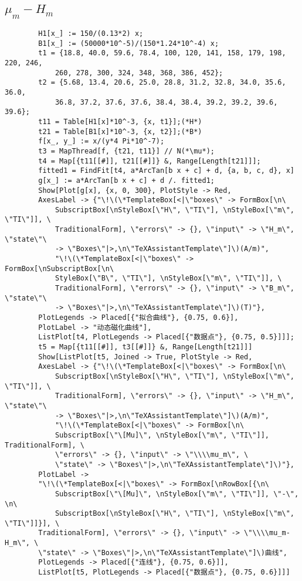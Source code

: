 \documentclass[11pt]{article}
\begin{document}
	\subsection{$\mu_m-H_m$}
	\begin{lstlisting}
		H1[x_] := 150/(0.13*2) x;
		B1[x_] := (50000*10^-5)/(150*1.24*10^-4) x;
		t1 = {18.8, 40.0, 59.6, 78.4, 100, 120, 141, 158, 179, 198, 220, 246, 
			260, 278, 300, 324, 348, 368, 386, 452};
		t2 = {5.68, 13.4, 20.6, 25.0, 28.8, 31.2, 32.8, 34.0, 35.6, 36.0, 
			36.8, 37.2, 37.6, 37.6, 38.4, 38.4, 39.2, 39.2, 39.6, 39.6};
		t11 = Table[H1[x]*10^-3, {x, t1}];(*H*)
		t21 = Table[B1[x]*10^-3, {x, t2}];(*B*)
		f[x_, y_] := x/(y*4 Pi*10^-7);
		t3 = MapThread[f, {t21, t11}] // N(*\mu*);
		t4 = Map[{t11[[#]], t21[[#]]} &, Range[Length[t21]]];
		fitted1 = FindFit[t4, a*ArcTan[b x + c] + d, {a, b, c, d}, x]
		g[x_] := a*ArcTan[b x + c] + d /. fitted1;
		Show[Plot[g[x], {x, 0, 300}, PlotStyle -> Red, 
		AxesLabel -> {"\!\(\*TemplateBox[<|\"boxes\" -> FormBox[\n\
			SubscriptBox[\nStyleBox[\"H\", \"TI\"], \nStyleBox[\"m\", \"TI\"]], \
			TraditionalForm], \"errors\" -> {}, \"input\" -> \"H_m\", \"state\"\
			-> \"Boxes\"|>,\n\"TeXAssistantTemplate\"]\)(A/m)", 
			"\!\(\*TemplateBox[<|\"boxes\" -> FormBox[\nSubscriptBox[\n\
			StyleBox[\"B\", \"TI\"], \nStyleBox[\"m\", \"TI\"]], \
			TraditionalForm], \"errors\" -> {}, \"input\" -> \"B_m\", \"state\"\
			-> \"Boxes\"|>,\n\"TeXAssistantTemplate\"]\)(T)"}, 
		PlotLegends -> Placed[{"拟合曲线"}, {0.75, 0.6}], 
		PlotLabel -> "动态磁化曲线"], 
		ListPlot[t4, PlotLegends -> Placed[{"数据点"}, {0.75, 0.5}]]];
		t5 = Map[{t11[[#]], t3[[#]]} &, Range[Length[t21]]]
		Show[ListPlot[t5, Joined -> True, PlotStyle -> Red, 
		AxesLabel -> {"\!\(\*TemplateBox[<|\"boxes\" -> FormBox[\n\
			SubscriptBox[\nStyleBox[\"H\", \"TI\"], \nStyleBox[\"m\", \"TI\"]], \
			TraditionalForm], \"errors\" -> {}, \"input\" -> \"H_m\", \"state\"\
			-> \"Boxes\"|>,\n\"TeXAssistantTemplate\"]\)(A/m)", 
			"\!\(\*TemplateBox[<|\"boxes\" -> FormBox[\n\
			SubscriptBox[\"\[Mu]\", \nStyleBox[\"m\", \"TI\"]], TraditionalForm], \
			\"errors\" -> {}, \"input\" -> \"\\\\mu_m\", \
			\"state\" -> \"Boxes\"|>,\n\"TeXAssistantTemplate\"]\)"}, 
		PlotLabel -> 
		"\!\(\*TemplateBox[<|\"boxes\" -> FormBox[\nRowBox[{\n\
			SubscriptBox[\"\[Mu]\", \nStyleBox[\"m\", \"TI\"]], \"-\", \n\
			SubscriptBox[\nStyleBox[\"H\", \"TI\"], \nStyleBox[\"m\", \"TI\"]]}], \
		TraditionalForm], \"errors\" -> {}, \"input\" -> \"\\\\mu_m-H_m\", \
		\"state\" -> \"Boxes\"|>,\n\"TeXAssistantTemplate\"]\)曲线", 
		PlotLegends -> Placed[{"连线"}, {0.75, 0.6}]], 
		ListPlot[t5, PlotLegends -> Placed[{"数据点"}, {0.75, 0.6}]]]
	\end{lstlisting}
	
\end{document}
